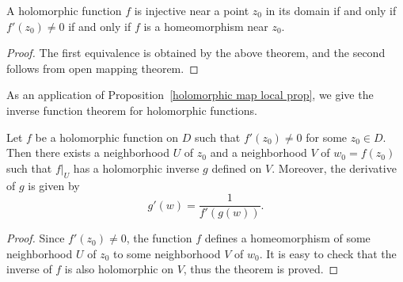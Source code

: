 \begin{corollary}
A holomorphic function $f$ is injective near a point $z_0$ in its domain if and only if $f'(z_0)\neq 0$ if and only if $f$ is a homeomorphism near $z_0$.
\end{corollary}
\begin{proof}
The first equivalence is obtained by the above theorem, and the second follows from open mapping theorem.
\end{proof}
As an application of Proposition~\ref{holomorphic map local prop}, we give the inverse function theorem for holomorphic functions.
\begin{theorem}
Let $f$ be a holomorphic function on $D$ such that $f'(z_0)\neq 0$ for some $z_0\in D$. Then there exists a neighborhood $U$ of $z_0$ and a neighborhood $V$ of $w_0=f(z_0)$ such that $f|_{U}$ has a holomorphic inverse $g$ defined on $V$. Moreover, the derivative of $g$ is given by
\[g'(w)=\frac{1}{f'(g(w))}.\]
\end{theorem}
\begin{proof}
Since $f'(z_0)\neq 0$, the function $f$ defines a homeomorphism of some neighborhood $U$ of $z_0$ to some neighborhood $V$ of $w_0$. It is easy to check that the inverse of $f$ is also holomorphic on $V$, thus the theorem is proved.
\end{proof}
